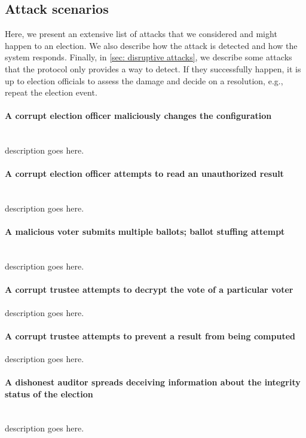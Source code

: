 \subsection{Attack scenarios} \label{sec: attack scenarios}
Here, we present an extensive list of attacks that we considered and might happen to an election. We also describe how the attack is detected and how the system responds. Finally, in \cref{sec: disruptive attacks}, we describe some attacks that the protocol only provides a way to detect. If they successfully happen, it is up to election officials to assess the damage and decide on a resolution, e.g., repeat the election event.


\paragraph{A corrupt election officer maliciously changes the configuration} \mbox{} \\
description goes here.


\paragraph{A corrupt election officer attempts to read an unauthorized result} \mbox{} \\
description goes here.


\paragraph{A malicious voter submits multiple ballots; ballot stuffing attempt} \mbox{} \\
description goes here.


\paragraph{A corrupt trustee attempts to decrypt the vote of a particular voter}
description goes here.


\paragraph{A corrupt trustee attempts to prevent a result from being computed}
description goes here.


\paragraph{A dishonest auditor spreads deceiving information about the integrity status of the election} \mbox{} \\
description goes here.


